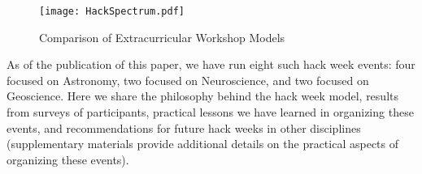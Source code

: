 \begin{figure}
\begin{center}
\texttt{[image: HackSpectrum.pdf]}
\caption{Comparison of Extracurricular Workshop Models}
\label{fig:hackspectrum}
\end{center}
\end{figure}

As of the publication of this paper, we have run eight such hack week events: four focused on Astronomy, two focused on Neuroscience, and two focused on Geoscience.
Here we share the philosophy behind the hack week model, results from surveys of participants, practical lessons we have learned in organizing these events, and recommendations for future hack weeks in other disciplines (supplementary materials provide additional details on the practical aspects of organizing these events).
